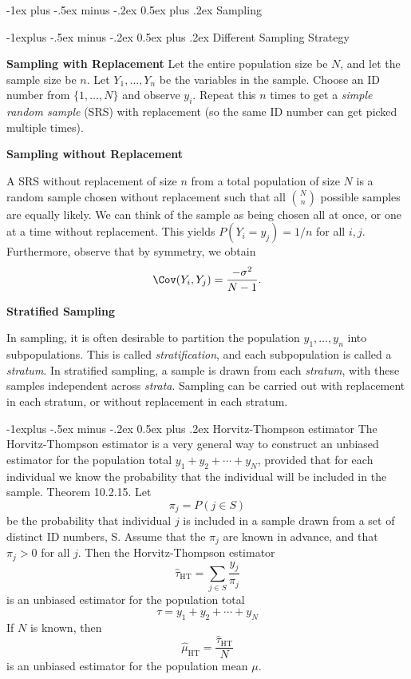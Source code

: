 \documentclass[10pt,landscape]{article}
\makeatletter
\renewcommand{\section}{\@startsection{section}{1}{0mm}%
                                {-1ex plus -.5ex minus -.2ex}%
                                {0.5ex plus .2ex}%
                                {\normalfont\large\bfseries}}
\renewcommand{\subsection}{\@startsection{subsection}{2}{0mm}%
                                {-1explus -.5ex minus -.2ex}%
                                {0.5ex plus .2ex}%
                                {\normalfont\normalsize\bfseries}}
\makeatother
\begin{document}
\begin{multicols*}{3}
\section{Sampling}

\subsection{Different Sampling Strategy}

\textbf{Sampling with Replacement}
Let the entire population size be $N$, and let the sample size be $n$. Let $Y_1,\dots,Y_n$ be the variables in the sample. Choose an ID number from $\{1,\dots,N\}$ and observe $y_i$. Repeat this $n$ times to get a \emph{simple random sample} (SRS) with replacement (so the same ID number can get picked multiple times). 

\textbf{Sampling without Replacement}

A SRS without replacement of size $n$ from a total population of size $N$ is a random sample chosen without replacement such that all $ \binom{N}{n} $ possible samples are equally likely. We can think of the sample as being chosen all at once, or one at a time without replacement. This yields $P(Y_i = y_j) = 1/n$ for all $i,j$. Furthermore, observe that by symmetry, we obtain
\[
\Cov(Y_i,Y_j)=\frac{-\sigma^2}{N-1}.
\]

\textbf{Stratified Sampling}

In sampling, it is often desirable to partition the population $y_1, \dots, y_n$ into subpopulations. This is called
\textit{stratification}, and each subpopulation is called a \textit{stratum}. In stratified sampling, a sample is drawn from each \textit{stratum}, with these samples independent across \textit{strata}. Sampling can be carried out with replacement in each stratum, or without replacement in each stratum. 

\subsection{Horvitz-Thompson estimator}
The Horvitz-Thompson estimator is a very general way to construct an unbiased estimator for the population total $y_1+y_2+\cdots+y_N$, provided that for each individual we know the probability that the individual will be included in the sample.
Theorem 10.2.15. Let
$$
\pi_j=P(j \in S)
$$
be the probability that individual $j$ is included in a sample drawn from a set of distinct ID numbers, S. Assume that the $\pi_j$ are known in advance, and that $\pi_j>0$ for all $j$. Then the Horvitz-Thompson estimator
$$
\hat{\tau}_{\mathrm{HT}}=\sum_{j \in S} \frac{y_j}{\pi_j}
$$
is an unbiased estimator for the population total
$$
\tau=y_1+y_2+\cdots+y_N
$$
If $N$ is known, then
$$
\hat{\mu}_{\mathrm{HT}}=\frac{\hat{\tau}_{\mathrm{HT}}}{N}
$$
is an unbiased estimator for the population mean $\mu$.


\end{multicols*}
\end{document}
